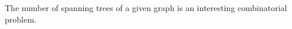 

\setcounter{section}{2}
\setcounter{subsection}{5}
\setcounter{dfn}{12}

The number of spanning trees of a given graph is an interesting combinatorial problem.



